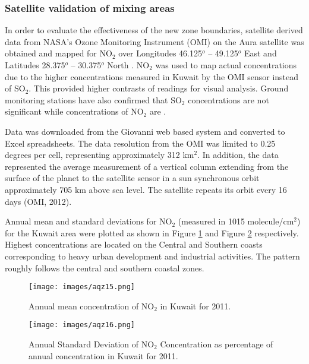 \subsubsection{Satellite validation of mixing areas}

In order to evaluate the effectiveness of the new zone boundaries, satellite derived data from NASA’s Ozone Monitoring Instrument (OMI) on the Aura satellite was obtained and mapped for NO$_{2}$ over Longitudes 46.125$^{o}$ – 49.125$^{o}$ East and Latitudes 28.375$^{o}$ – 30.375$^{o}$ North \citep{Boersma2011, Strawa2013}.  NO$_{2}$ was used to map actual concentrations due to the higher concentrations measured in Kuwait by the OMI sensor instead of SO$_{2}$.  This provided higher contrasts of readings for visual analysis. Ground monitoring stations have also confirmed that SO$_{2}$ concentrations are not significant while concentrations of NO$_{2}$ are \citep{Al-Awadhi2014}.

Data was downloaded from the Giovanni web based system \citep{Acker2007} and converted to Excel spreadsheets.  The data resolution from the OMI was limited to 0.25 degrees per cell, representing approximately 312 km$^{2}$.  In addition, the data represented the average measurement of a vertical column extending from the surface of the planet to the satellite sensor in a sun synchronous orbit approximately 705 km above sea level.  The satellite repeats its orbit every 16 days (OMI, 2012). 

Annual mean and standard deviations for NO$_{2}$ (measured in 1015 molecule/cm$^{2}$) for the Kuwait area were plotted as shown in Figure \ref{fig:15meanNO2} and Figure \ref{fig:16stdNO2} respectively.  Highest concentrations are located on the Central and Southern coasts corresponding to heavy urban development and industrial activities. The pattern roughly follows the central and southern coastal zones.

%
\begin{figure}[H]
\texttt{[image: images/aqz15.png]} 
\caption{Annual mean concentration of NO$_{2}$ in Kuwait for 2011.}
\label{fig:15meanNO2}
\end{figure}
%
%
\begin{figure}[H]
\texttt{[image: images/aqz16.png]} 
\caption[Annual Standard Deviation of NO$_{2}$ Concentration]{Annual Standard Deviation of NO$_{2}$ Concentration as percentage of annual concentration in Kuwait for 2011.}
\label{fig:16stdNO2}
\end{figure}
%

